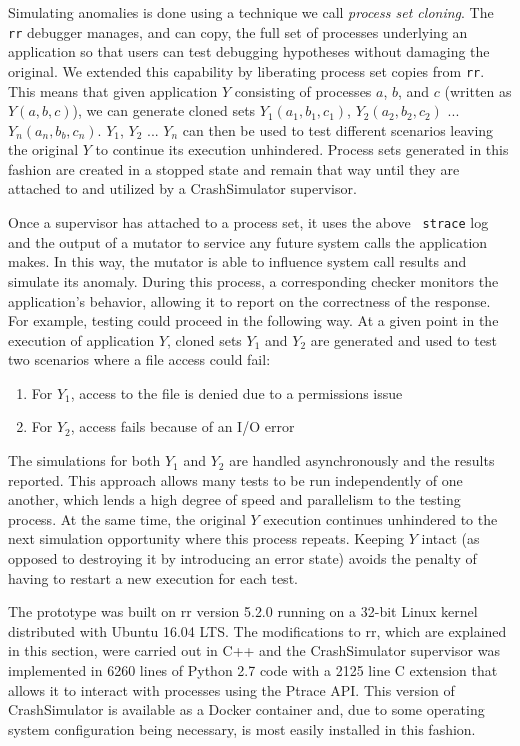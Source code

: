 Simulating anomalies
is done using
a technique
we call {\it process set cloning}.
The {\tt rr} debugger manages,
and can copy,
the full set of processes underlying an application
so that users can test debugging
hypotheses without damaging the original.
We extended this capability
by liberating process set copies from {\tt rr}.
This means that given application $Y$
consisting of processes $a$, $b$, and $c$
(written as $Y(a, b, c)$),
we can generate cloned sets $Y_1(a_1, b_1, c_1)$,
$Y_2(a_2, b_2, c_2)$ ... $Y_n(a_n, b_b, c_n)$.
$Y_1$, $Y_2$ ... $Y_n$ can then be used to test different scenarios leaving
the original $Y$ to continue its execution unhindered.
Process sets generated in this fashion are created in a stopped state and
remain that way until they are attached to and utilized by a CrashSimulator
supervisor.

Once a supervisor has attached to a process set, it uses the above {\tt
strace} log and the output of a mutator to service any future
system calls the application makes.  In this way, the mutator is able to
influence system call results and simulate its anomaly.
During this process,
a corresponding checker
monitors the application's behavior,
allowing it to report on the correctness of the response.
For example, testing could proceed in the following way.
At a given point in the execution of application $Y$,
cloned sets $Y_1$ and $Y_2$ are generated and
used to test two scenarios where a file access could fail:
\begin{enumerate}
    \item{For $Y_1$, access to the file is denied due to a permissions issue}
    \item{For $Y_2$, access fails because of an I/O error}
\end{enumerate}
The simulations for both $Y_1$ and $Y_2$ are handled asynchronously and
the results reported.
This approach allows many tests to be run independently of one another,
which lends a
high degree of speed and
parallelism to the testing process.
At the same time, the original $Y$ execution continues unhindered to the
next simulation opportunity where this process repeats.
Keeping $Y$ intact
(as opposed to destroying it by introducing an error state)
avoids the penalty
of having to restart a new execution for each test.

The prototype was built on rr version 5.2.0 running on a 32-bit Linux kernel
distributed with Ubuntu 16.04 LTS.  The modifications to rr, which are
explained in this section, were carried out in C++ and the CrashSimulator
supervisor was implemented in 6260 lines of Python 2.7 code with a 2125
line C extension that allows it to interact with processes using the Ptrace
API.
This version of CrashSimulator is available as a Docker container and,
due to some operating system configuration being necessary, is most easily
installed in this fashion.
